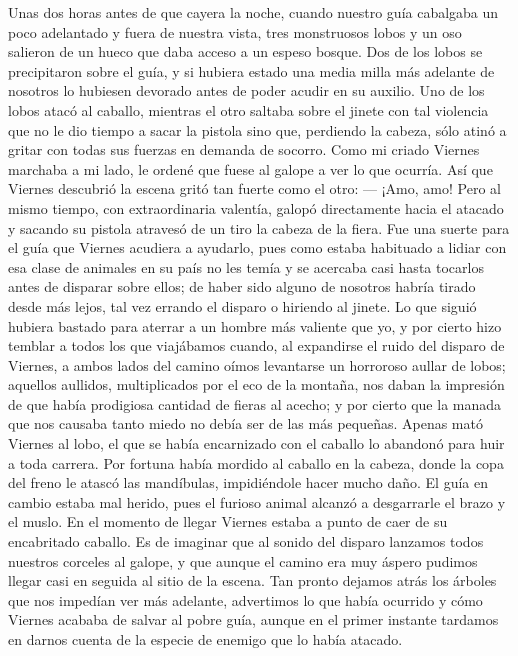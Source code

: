 \documentclass{novela}
\begin{document}
    Unas dos horas antes de que cayera la noche, cuando nuestro guía cabalgaba un poco adelantado y fuera de nuestra vista, tres monstruosos lobos y un oso salieron de un hueco que daba acceso a un espeso bosque. Dos de los lobos se precipitaron sobre el guía, y si hubiera estado una media milla más adelante de nosotros lo hubiesen devorado antes de poder acudir en su auxilio. Uno de los lobos atacó al caballo, mientras el otro saltaba sobre el jinete con tal violencia que no le dio tiempo a sacar la pistola sino que, perdiendo la cabeza, sólo atinó a gritar con todas sus fuerzas en demanda de socorro. Como mi criado Viernes marchaba a mi lado, le ordené que fuese al galope a ver lo que ocurría. Así que Viernes descubrió la escena gritó tan fuerte como el otro:
    — ¡Amo, amo!
    Pero al mismo tiempo, con extraordinaria valentía, galopó directamente hacia el atacado y sacando su pistola atravesó de un tiro la cabeza de la fiera.
    Fue una suerte para el guía que Viernes acudiera a ayudarlo, pues como estaba habituado a lidiar con esa clase de animales en su país no les temía y se acercaba casi hasta tocarlos antes de disparar sobre ellos; de haber sido alguno de nosotros habría tirado desde más lejos, tal vez errando el disparo o hiriendo al jinete.
    Lo que siguió hubiera bastado para aterrar a un hombre más valiente que yo, y por cierto hizo temblar a todos los que viajábamos cuando, al expandirse el ruido del disparo de Viernes, a ambos lados del camino oímos levantarse un horroroso aullar de lobos; aquellos aullidos, multiplicados por el eco de la montaña, nos daban la impresión de que había prodigiosa cantidad de fieras al acecho; y por cierto que la manada que nos causaba tanto miedo no debía ser de las más pequeñas.
    Apenas mató Viernes al lobo, el que se había encarnizado con el caballo lo abandonó para huir a toda carrera. Por fortuna había mordido al caballo en la cabeza, donde la copa del freno le atascó las mandíbulas, impidiéndole hacer mucho daño. El guía en cambio estaba mal herido, pues el furioso animal alcanzó a desgarrarle el brazo y el muslo. En el momento de llegar Viernes estaba a punto de caer de su encabritado caballo.
    Es de imaginar que al sonido del disparo lanzamos todos nuestros corceles al galope, y que aunque el camino era muy áspero pudimos llegar casi en seguida al sitio de la escena.
    Tan pronto dejamos atrás los árboles que nos impedían ver más adelante, advertimos lo que había ocurrido y cómo Viernes acababa de salvar al pobre guía, aunque en el primer instante tardamos en darnos cuenta de la especie de enemigo que lo había atacado.
\end{document}

